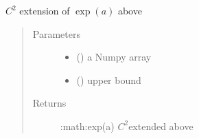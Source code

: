 \documentclass[letterpaper,10pt,english]{sphinxmanual}
\begin{document}
\begin{fulllineitems}
\label{\detokenize{ipfp_utils:ipfp_utils.npexp}}
\(C^2\) extension of  \(\exp(a)\) above 
\begin{quote}\begin{description}
\item[{Parameters}] \leavevmode\begin{itemize}
\item {} 
 () \textendash{} a Numpy array

\item {} 
 () \textendash{} upper bound

\end{itemize}

\item[{Returns}] \leavevmode
:math:exp(a)\textasciigrave{}  \(C^2\)\sphinxhyphen{}extended above 

\end{description}\end{quote}

\end{fulllineitems}

\end{document}
